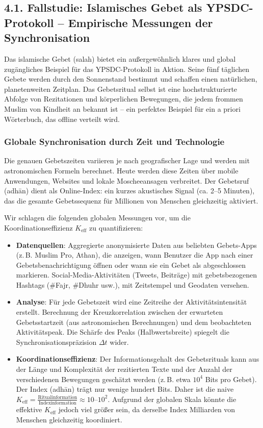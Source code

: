 \documentclass[12pt,a4paper]{article}
\newcommand{\Keff}{K_{\mathrm{eff}}}   %
\begin{document}
	\subsection{4.1. Fallstudie: Islamisches Gebet als YPSDC-Protokoll – Empirische Messungen der Synchronisation}
	\label{subsec:islamic_prayer}
	
	Das islamische Gebet (salah) bietet ein außergewöhnlich klares und global zugängliches Beispiel für das YPSDC-Protokoll in Aktion. Seine fünf täglichen Gebete werden durch den Sonnenstand bestimmt und schaffen einen natürlichen, planetenweiten Zeitplan. Das Gebetsritual selbst ist eine hochstrukturierte Abfolge von Rezitationen und körperlichen Bewegungen, die jedem frommen Muslim von Kindheit an bekannt ist – ein perfektes Beispiel für ein a priori Wörterbuch, das offline verteilt wird.
	
	\subsubsection{Globale Synchronisation durch Zeit und Technologie}
	Die genauen Gebetszeiten variieren je nach geografischer Lage und werden mit astronomischen Formeln berechnet. Heute werden diese Zeiten über mobile Anwendungen, Websites und lokale Moscheeansagen verbreitet. Der Gebetsruf (adhān) dient als Online-Index: ein kurzes akustisches Signal (ca. 2–5 Minuten), das die gesamte Gebetssequenz für Millionen von Menschen gleichzeitig aktiviert.
	
	Wir schlagen die folgenden globalen Messungen vor, um die Koordinationseffizienz \(\Keff\) zu quantifizieren:
	\begin{itemize}
		\item \textbf{Datenquellen}: Aggregierte anonymisierte Daten aus beliebten Gebets-Apps (z. B. Muslim Pro, Athan), die anzeigen, wann Benutzer die App nach einer Gebetsbenachrichtigung öffnen oder wann sie ein Gebet als abgeschlossen markieren. Social-Media-Aktivitäten (Tweets, Beiträge) mit gebetsbezogenen Hashtags (\#Fajr, \#Dhuhr usw.), mit Zeitstempel und Geodaten versehen.
		\item \textbf{Analyse}: Für jede Gebetszeit wird eine Zeitreihe der Aktivitätsintensität erstellt. Berechnung der Kreuzkorrelation zwischen der erwarteten Gebetsstartzeit (aus astronomischen Berechnungen) und dem beobachteten Aktivitätspeak. Die Schärfe des Peaks (Halbwertsbreite) spiegelt die Synchronisationspräzision \(\Delta t\) wider.
		\item \textbf{Koordinationseffizienz}: Der Informationsgehalt des Gebetsrituals kann aus der Länge und Komplexität der rezitierten Texte und der Anzahl der verschiedenen Bewegungen geschätzt werden (z. B. etwa \(10^4\) Bits pro Gebet). Der Index (adhān) trägt nur wenige hundert Bits. Daher ist die naive \(\Keff = \frac{\text{Ritualinformation}}{\text{Indexinformation}} \approx 10\)–\(10^2\). Aufgrund der globalen Skala könnte die effektive \(\Keff\) jedoch viel größer sein, da derselbe Index Milliarden von Menschen gleichzeitig koordiniert.
	\end{itemize}
	
\end{document}
